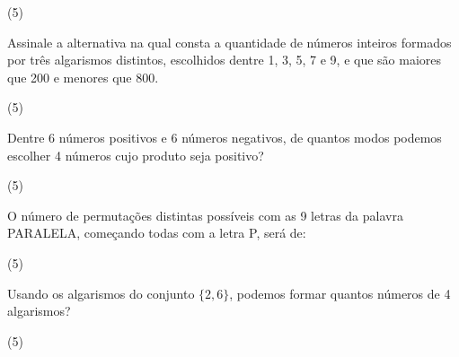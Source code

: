 \documentclass[10pt,a4paper]{article}
\begin{document}
\begin{multicols}{2}
\begin{question}[type=exam]
        \begin{tasks}(5)
        \end{tasks}
    \end{question}

    \begin{question}[type=exam]
        Assinale a alternativa na qual consta a quantidade de números inteiros
        formados por três algarismos distintos, escolhidos dentre 1, 3, 5, 7 e 9,
        e que são maiores que 200 e menores que 800.

        \begin{tasks}(5)
        \end{tasks}
    \end{question}

    \begin{question}[type=exam]
        Dentre 6 números positivos e 6 números negativos, de quantos modos
        podemos escolher 4 números cujo produto seja positivo?

        \begin{tasks}(5)
        \end{tasks}
    \end{question}

    \begin{question}[type=exam]
        O número de permutações distintas possíveis com as 9 letras da palavra
        PARALELA, começando todas com a letra P, será de:

        \begin{tasks}(5)
        \end{tasks}
    \end{question}

    \begin{question}[type=exam]
        Usando os algarismos do conjunto $\{2, 6\}$, podemos formar quantos números
        de 4 algarismos?

        \begin{tasks}(5)
        \end{tasks}
    \end{question}


\end{multicols}
\end{document}
